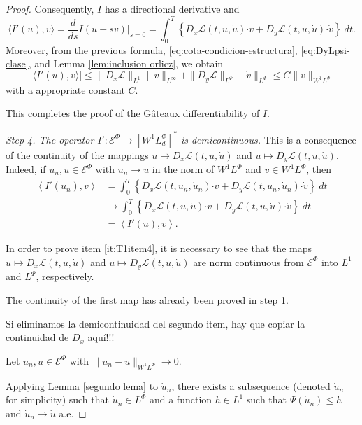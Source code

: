 \documentclass[twoside]{article}
\theoremstyle{remark}
\newcommand{\orlnor}{\|_{L^{\Phi}}}
\newcommand{\linf}{\|_{L^{\infty}}}
\newcommand{\lphi}{L^{\Phi}}
\newcommand{\lpsi}{L^{\Psi}}
\newcommand{\wphi}{W^{1}\lphi}
\newcommand{\sobnor}{\|_{W^{1}\lphi}}
\newcommand{\domi}{\mathcal{E}^{\Phi}}
\renewcommand{\b}[1]{\boldsymbol{#1}}
\newcommand{\ccdot}{\b{\cdot}}
\renewcommand{\leq}{\leqslant}
\begin{document}
\begin{proof}
Consequently, $I$ has a directional derivative and
\[
\langle I'(u),v \rangle=\frac{d}{ds}I(u+s v)\big|_{s=0}=\int_0^T  
\left\{D_{x}\mathcal{L}(t,u,\dot{u})\ccdot v+ D_{y}\mathcal{L}(t,u,\dot{u})\ccdot \dot{v}\right\} \ dt.
\]
Moreover, from the previous formula, \eqref{eq:cota-condicion-estructura},  \eqref{eq:DyLpsi-clase}, and
Lemma \ref{lem:inclusion orlicz}, we obtain
\[
|\langle I'(u),v \rangle| \leq \|D_{x}\mathcal{L}\|_{L^1} \| v\linf + 
\|D_{y}\mathcal{L}\|_{\lpsi} \|\dot{v}\orlnor \leq C \|v\sobnor
\]
with a appropriate constant $C$.

This completes the proof of the G\^ateaux differentiability of $I$. 



\emph{Step 4. The operator $I':\domi  \to \left[\wphi_d
\right]^* $ is demicontinuous.}
This is a consequence  of the continuity of the mappings $u \mapsto D_{x}\mathcal{L}(t,u,\dot{u})$ and $u \mapsto
D_{y}\mathcal{L}(t,u,\dot{u})$. Indeed, if $u_n,u\in \domi$ with $u_n\to u$ in the norm of $\wphi$ and $v \in
\wphi$, then
\[
\begin{split}
\left\langle  I'(u_{n}),v \right\rangle &= \int_0^T \left\{  D_{x}\mathcal{L}\left(t,u_n,\dot{u}_n\right)\ccdot
v +
 D_{y}\mathcal{L}\left(t,u_n,\dot{u}_n\right)\ccdot \dot{v}\right\} \ dt\\
&\rightarrow \int_0^T \left\{ D_{x}\mathcal{L}\left(t,u,\dot{u}\right)\ccdot v+ 
D_{y}\mathcal{L}\left(t,u,\dot{u}\right)\ccdot \dot{v}\right\} \ dt\\
&=\left\langle  I'(u),v \right\rangle.
\end{split}
\]


In order to prove item  \ref{it:T1item4}, it is necessary to see that the maps $u\mapsto D_{x}\mathcal{L}(t,u,\dot{u})$  
and $u\mapsto D_{y}\mathcal{L}(t,u,\dot{u})$  are norm continuous
from $\domi $ into $L^1$ and
 $\lpsi$, respectively.  

The continuity of the first map has already been proved in step 1. 

Si eliminamos la demicontinuidad del segundo item, hay que copiar 
la continuidad de $D_x$ aqu\'i!!!

Let $u_n, u \in \domi$ with $\|u_n- u\sobnor\to 0$.  

Applying Lemma \ref{segundo lema} to $\dot{u}_n$, 
there exists a subsequence (denoted $\dot{u}_n$ for simplicity)
such that
$\dot{u}_n \in L^\Phi$ and a function  $h \in L^1$  such that  $\Psi(\dot{u}_n)\leq h$ and $\dot{u}_n \to \dot{u}$ a.e.


\end{proof}
\end{document}
